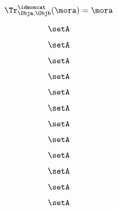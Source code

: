 \begin{forslides}
    \begin{equation}
        \label{eq:feedback-162}
        \Tr_{\Obja,\Objb}^\idmoncat (\mora)=\mora
    \end{equation}

    \begin{equation}
        \label{eq:feedback-163}
        \setA
    \end{equation}

    \begin{equation}
        \label{eq:feedback-164}
        \setA
    \end{equation}

    \begin{equation}
        \label{eq:feedback-165}
        \setA
    \end{equation}

    \begin{equation}
        \label{eq:feedback-166}
        \setA
    \end{equation}

    \begin{equation}
        \label{eq:feedback-167}
        \setA
    \end{equation}

    \begin{equation}
        \label{eq:feedback-168}
        \setA
    \end{equation}

    \begin{equation}
        \label{eq:feedback-169}
        \setA
    \end{equation}

    \begin{equation}
        \label{eq:feedback-170}
        \setA
    \end{equation}

    \begin{equation}
        \label{eq:feedback-171}
        \setA
    \end{equation}

    \begin{equation}
        \label{eq:feedback-172}
        \setA
    \end{equation}

    \begin{equation}
        \label{eq:feedback-173}
        \setA
    \end{equation}

    \begin{equation}
        \label{eq:feedback-174}
        \setA
    \end{equation}


\end{forslides}
